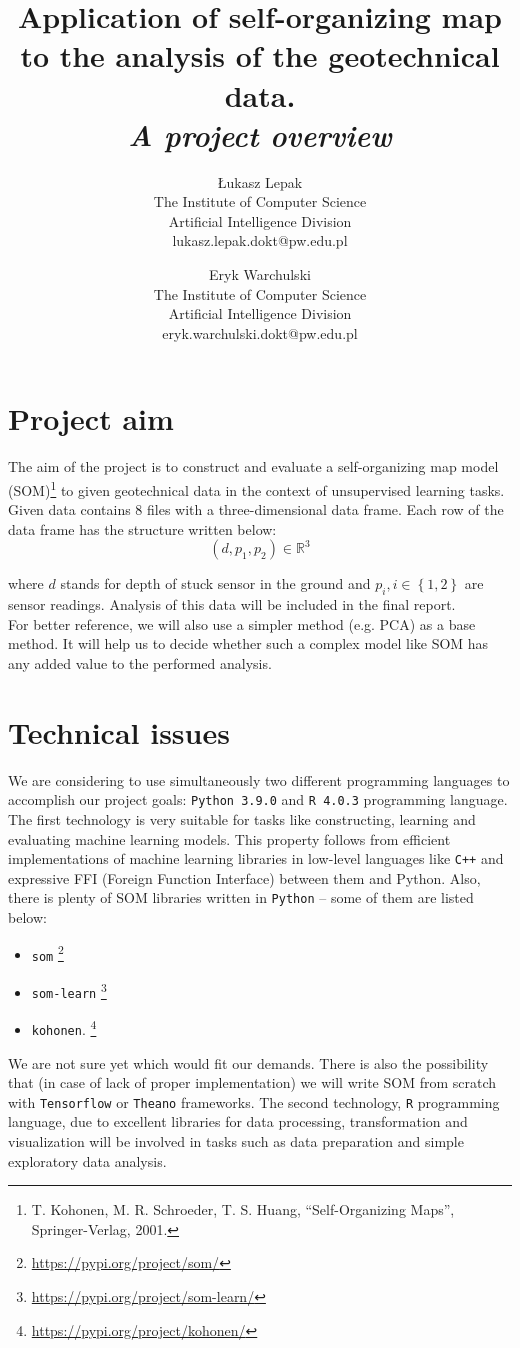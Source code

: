 \documentclass{article}
\title{\textbf{Application of self-organizing map to the analysis of the geotechnical data}.\\ \textit{A project overview}}
\author{%
\begin{tabular}{c} Łukasz Lepak \\ The Institute of Computer Science \\ Artificial Intelligence Division \\ lukasz.lepak.dokt@pw.edu.pl \end{tabular} \and
\begin{tabular}{c} Eryk Warchulski \\  The Institute of Computer Science \\ Artificial Intelligence Division \\ eryk.warchulski.dokt@pw.edu.pl \end{tabular} 
}
\date{}
\begin{document}
\maketitle

\section{Project aim}
The aim of the project is to construct and evaluate a self-organizing map model (SOM)\footnote{T. Kohonen, M. R. Schroeder, T. S. Huang, “Self-Organizing Maps”, Springer-Verlag, 2001.} to given geotechnical data in the context of unsupervised learning tasks.
Given data contains 8 files with a three-dimensional data frame. Each row of the data frame has the structure written below:
\begin{equation}
  \left(d, p_1, p_2 \right) \in \mathbb{R}^{3}
\end{equation}

\noindent where $d$ stands for depth of stuck sensor in the ground and $p_i, i\in\left\{1, 2\right\}$ are sensor readings. Analysis of this data will be included in the final report.\\
For better reference, we will also use a simpler method (e.g. PCA) as a base method. It will help us to decide whether such a complex model like SOM has any added value to the performed analysis. 

\section{Technical issues}

We are considering to use simultaneously two different programming languages to accomplish our project goals: \texttt{Python 3.9.0} and \texttt{R 4.0.3} programming language.
The first technology is very suitable for tasks like constructing, learning and evaluating machine learning models. This property follows from efficient implementations of machine learning libraries in low-level languages like \texttt{C++} and expressive FFI (Foreign Function Interface) between them and Python. Also, there is plenty of SOM libraries written in \texttt{Python} -- some of them are listed below:

\begin{itemize}
  \item \texttt{som} \footnote{\url{https://pypi.org/project/som/}}
  \item \texttt{som-learn} \footnote{\url{https://pypi.org/project/som-learn/}}
  \item \texttt{kohonen}. \footnote{\url{https://pypi.org/project/kohonen/}}
\end{itemize}

We are not sure yet which would fit our demands. There is also the possibility that (in case of lack of proper implementation) we will write SOM from scratch with \texttt{Tensorflow} or \texttt{Theano} frameworks.
The second technology, \texttt{R} programming language, due to excellent libraries for data processing, transformation and visualization will be involved in tasks such as data preparation and simple exploratory data analysis.
\end{document}
